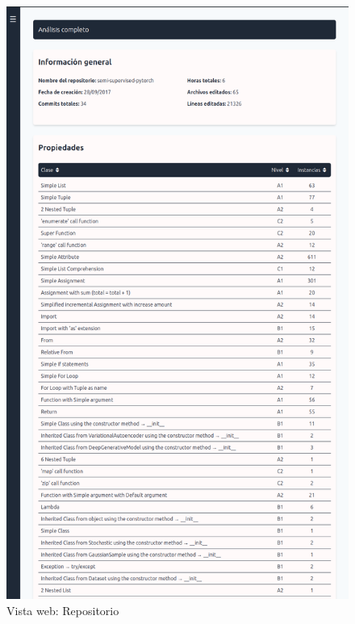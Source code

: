 \documentclass[a4paper, 12pt]{book}
\begin{document}
\vspace{1em}
\begin{figure}[ht]
    \centering
    \includegraphics[height=\textheight, keepaspectratio]{img/results/frontend_exe_repo.png}
    \caption{Vista web: Repositorio}
    \label{fig:frontend_home}
\end{figure}

\end{document}
